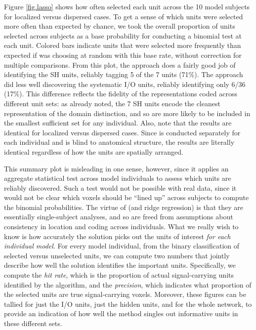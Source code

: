 Figure \ref{fig.lasso} shows how often {\lasso} selected each unit across the 10 model subjects for localized versus dispersed cases. To get a sense of which units were selected more often than expected by chance, we took the overall proportion of units selected across subjects as a base probability for conducting a binomial test at each unit. Colored bars indicate units that were selected more frequently than expected if {\lasso} was choosing at random with this base rate, without correction for multiple comparisons. From this plot, the approach does a fairly good job of identifying the SH units, reliably tagging 5 of the 7 units (71\%). The approach did less well discovering the systematic I/O units, reliably identifying only 6/36 (17\%). This difference reflects the fidelity of the representations coded across different unit sets: as already noted, the 7 SH units encode the cleanest representation of the domain distinction, and so are more likely to be included in the smallest sufficient set for any individual. Also, note that the results are identical for localized versus dispersed cases. Since {\lasso} is conducted separately for each individual and is blind to anatomical structure, the results are literally identical regardless of how the units are spatially arranged.

This summary plot is misleading in one sense, however, since it applies an aggregate statistical test across model individuals to assess which units are reliably discovered. Such a test would not be possible with real data, since it would not be clear which voxels should be ``lined up'' across subjects to compute the binomial probabilities. The virtue of {\lasso} (and ridge regression) is that they are essentially single-subject analyses, and so are freed from assumptions about consistency in location and coding across individuals. What we really wish to know is how accurately the solution picks out the units of interest {\em for each individual model}. For every model individual, from the binary classification of selected versus unselected units, we can compute two numbers that jointly describe how well the solution identifies the important units. Specifically, we compute the {\em hit rate}, which is the proportion of actual signal-carrying units identified by the algorithm, and the {\em precision}, which indicates what proportion of the selected units are true signal-carrying voxels. Moreover, these figures can be tallied for just the I/O units, just the hidden units, and for the whole network, to provide an indication of how well the method singles out informative units in these different sets. 

